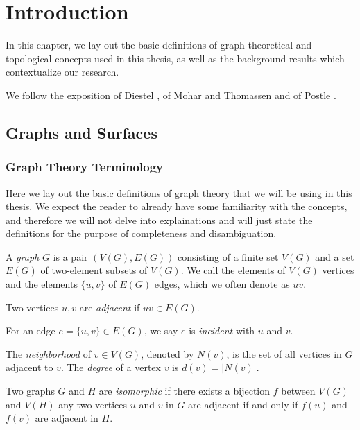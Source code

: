 \chapter{Introduction}

In this chapter, we lay out the basic definitions of graph theoretical and topological concepts used in this thesis, as well as the background results which contextualize our research.

We follow the exposition of Diestel \cite{diestel}, of Mohar and Thomassen \cite{graphsonsurfaces}
and of Postle \cite{postlethesis}. 

\section{Graphs and Surfaces}


\subsection{Graph Theory Terminology}

Here we lay out the basic definitions of graph theory that we will be using in this thesis. We expect
the reader to already have some familiarity with the concepts, and therefore we will not delve into
explainations and will just state the definitions for the purpose of completeness and 
disambiguation.                                                                                                                                                                                              

\begin{definition}
A \emph{graph} $G$ is a pair $(V(G), E(G))$ consisting of a finite set $V(G)$ and a set $E(G)$ of two-element
 subsets of $V(G)$. We call the elements of $V(G)$ vertices and
the elements $\{u, v\}$ of $E(G)$ edges, which we often denote as $uv$.
\end{definition}

\begin{definition}
	Two vertices $u, v$ are \emph{adjacent} if $uv \in E(G)$. 
	
	For an edge $e = \{u,v\} \in E(G)$, 
	we say $e$ is \emph{incident} with $u$ and $v$. 
	
	The \emph{neighborhood} of $v \in V(G)$, denoted by $N(v)$, is the set of all vertices
	in $G$ adjacent to $v$. The \emph{degree} of a vertex $v$ is $d(v) = |N(v)|$.
\end{definition}

\begin{definition}
	Two graphs $G$ and $H$ are \emph{isomorphic} if there exists a bijection $f$
	between $V(G)$ and $V(H)$ any two vertices $u$ and $v$ in $G$ are adjacent if and only
	if $f(u)$ and $f(v)$ are adjacent in $H$.
\end{definition}

